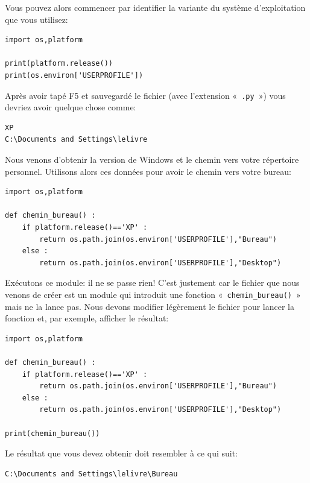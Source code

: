 Vous pouvez alors commencer par identifier la variante du système d'exploitation que vous utilisez:
\begin{Verbatim}[frame=single,rulecolor=\color{mbleu}, label=à taper]
import os,platform

print(platform.release())
print(os.environ['USERPROFILE'])
\end{Verbatim}

Après avoir tapé F5 et sauvegardé le fichier (avec l'extension «~\texttt{.py}~»)  vous devriez avoir quelque chose comme:

\begin{Verbatim}[frame=single,rulecolor=\color{gray}, label=résultat]
XP
C:\Documents and Settings\lelivre
\end{Verbatim}

Nous venons d'obtenir la version de Windows et le chemin vers votre répertoire personnel.
Utilisons alors ces données pour avoir le chemin vers votre bureau:

\begin{Verbatim}[frame=single,rulecolor=\color{mbleu}, label=à taper]
import os,platform

def chemin_bureau() :
    if platform.release()=='XP' :
        return os.path.join(os.environ['USERPROFILE'],"Bureau")
    else :
        return os.path.join(os.environ['USERPROFILE'],"Desktop")
\end{Verbatim}

Exécutons ce module: il ne se passe rien! C'est justement car le fichier que nous venons de créer est un module qui introduit une fonction «~\texttt{chemin\_bureau()}~» mais ne la lance pas. Nous devons modifier légèrement le fichier pour lancer la fonction et, par exemple, afficher le résultat:

\begin{Verbatim}[frame=single,rulecolor=\color{mbleu}, label=à taper]
import os,platform

def chemin_bureau() :
    if platform.release()=='XP' :
        return os.path.join(os.environ['USERPROFILE'],"Bureau")
    else :
        return os.path.join(os.environ['USERPROFILE'],"Desktop")
    
print(chemin_bureau())
\end{Verbatim}

Le résultat que vous devez obtenir doit resembler à ce qui suit:

\begin{Verbatim}[frame=single,rulecolor=\color{gray}, label=résultat]
C:\Documents and Settings\lelivre\Bureau
\end{Verbatim}

